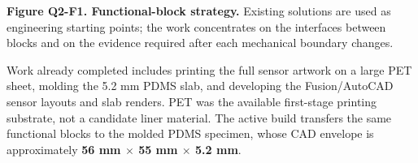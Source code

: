 \vspace{0.45em}
\begin{center}
\end{center}
{\fontsize{7.5}{8.7}\selectfont\color{AUBGray}
\textbf{Figure Q2-F1. Functional-block strategy.} Existing solutions are used
as engineering starting points; the work concentrates on the interfaces between
blocks and on the evidence required after each mechanical boundary changes.\par}

\clearpage
{}

\hypertarget{q2-current-build}{}

{\fontsize{9.65}{11.4}\selectfont
Work already completed includes printing the full sensor artwork on a large PET
sheet, molding the 5.2 mm PDMS slab, and developing the Fusion/AutoCAD sensor
layouts and slab renders. PET was the available first-stage printing substrate,
not a candidate liner material. The active build transfers the same functional
blocks to the molded PDMS specimen, whose CAD envelope is approximately
\textbf{56 mm $\times$ 55 mm $\times$ 5.2 mm}.\par}

